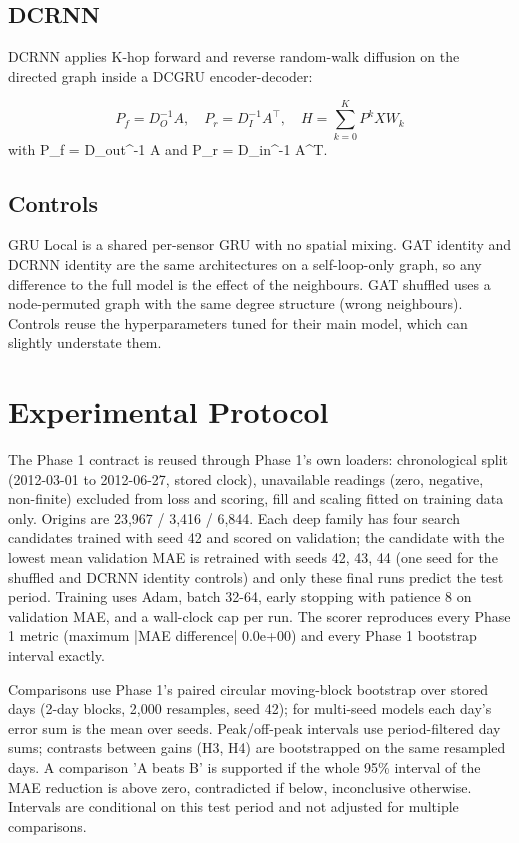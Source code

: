\documentclass[conference]{IEEEtran}
\begin{document}
\subsection{DCRNN}
DCRNN applies K-hop forward and reverse random-walk diffusion on the directed graph inside a DCGRU encoder-decoder:

\begin{equation}P_f=D_O^{-1}A,\quad P_r=D_I^{-1}A^\top,\quad H=\sum_{k=0}^K P^k X W_k\end{equation}
with P\_f = D\_out\textasciicircum{}-1 A and P\_r = D\_in\textasciicircum{}-1 A\textasciicircum{}T.

\subsection{Controls}
GRU Local is a shared per-sensor GRU with no spatial mixing. GAT identity and DCRNN identity are the same architectures on a self-loop-only graph, so any difference to the full model is the effect of the neighbours. GAT shuffled uses a node-permuted graph with the same degree structure (wrong neighbours). Controls reuse the hyperparameters tuned for their main model, which can slightly understate them.

\section{Experimental Protocol}
The Phase 1 contract is reused through Phase 1's own loaders: chronological split (2012-03-01 to 2012-06-27, stored clock), unavailable readings (zero, negative, non-finite) excluded from loss and scoring, fill and scaling fitted on training data only. Origins are 23,967 / 3,416 / 6,844. Each deep family has four search candidates trained with seed 42 and scored on validation; the candidate with the lowest mean validation MAE is retrained with seeds 42, 43, 44 (one seed for the shuffled and DCRNN identity controls) and only these final runs predict the test period. Training uses Adam, batch 32-64, early stopping with patience 8 on validation MAE, and a wall-clock cap per run. The scorer reproduces every Phase 1 metric (maximum |MAE difference| 0.0e+00) and every Phase 1 bootstrap interval exactly.

Comparisons use Phase 1's paired circular moving-block bootstrap over stored days (2-day blocks, 2,000 resamples, seed 42); for multi-seed models each day's error sum is the mean over seeds. Peak/off-peak intervals use period-filtered day sums; contrasts between gains (H3, H4) are bootstrapped on the same resampled days. A comparison 'A beats B' is supported if the whole 95\% interval of the MAE reduction is above zero, contradicted if below, inconclusive otherwise. Intervals are conditional on this test period and not adjusted for multiple comparisons.
\end{document}
